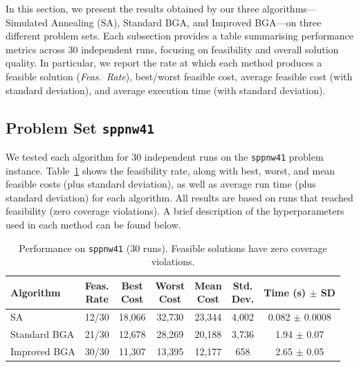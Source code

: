 \documentclass[12pt]{article}
\begin{document}
In this section, we present the results obtained by our three algorithms---Simulated Annealing (SA), Standard BGA, and Improved BGA---on three different problem sets. Each subsection provides a table summarising performance metrics across 30 independent runs, focusing on feasibility and overall solution quality. In particular, we report the rate at which each method produces a feasible solution (\emph{Feas.\ Rate}), best/worst feasible cost, average feasible cost (with standard deviation), and average execution time (with standard deviation).

\subsection{Problem Set \texttt{sppnw41}}
\label{subsec:sppnw41}

We tested each algorithm for 30 independent runs on the \texttt{sppnw41} problem instance. 
Table~\ref{tab:sppnw41} shows the feasibility rate, along with best, worst, and mean feasible costs (plus standard deviation), as well as average run time (plus standard deviation) for each algorithm. 
All results are based on runs that reached feasibility (zero coverage violations). 
A brief description of the hyperparameters used in each method can be found below.

\vspace{1em}

\begin{table}[htbp]
  \centering
  \label{tab:sppnw41}
  \renewcommand{\arraystretch}{1.1}
  \begin{tabular}{lcccccc}
    \hline
    \textbf{Algorithm} & \makecell{Feas.\\Rate} & \makecell{Best\\Cost} & \makecell{Worst\\Cost} & \makecell{Mean\\Cost} & \makecell{Std.\\Dev.} & \makecell{Time\\(s) $\pm$ SD}\\
    \hline
    SA            
      & 12/30 
      & 18,066
      & 32,730 
      & 23,344
      & 4,002 
      & 0.082 $\pm$ 0.0008 \\
    Standard BGA 
      & 21/30 
      & 12,678 
      & 28,269 
      & 20,188 
      & 3,736 
      & 1.94 $\pm$ 0.07 \\
    Improved BGA 
      & 30/30 
      & 11,307 
      & 13,395 
      & 12,177 
      & 658 
      & 2.65 $\pm$ 0.05 \\
    \hline
  \end{tabular}
  \caption{Performance on \texttt{sppnw41} (30 runs). Feasible solutions have zero coverage violations.}
\end{table}
\end{document}
